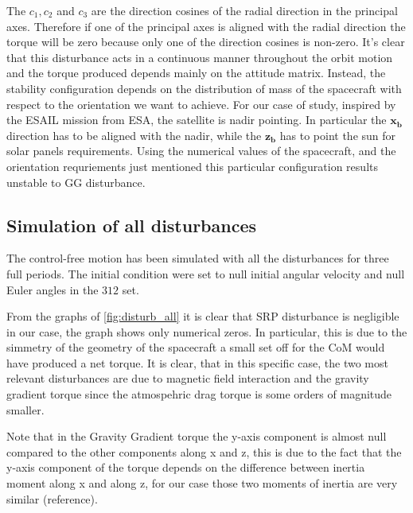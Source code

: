 The \( c_1, c_2 \) and \( c_3 \) are the direction cosines of the radial direction in the principal axes. 
Therefore if one of the principal axes is aligned with the radial direction the torque will be zero because only one of the direction cosines is non-zero.
It's clear that this disturbance acts in a continuous manner throughout the orbit motion and the torque produced depends mainly on the attitude matrix.
Instead, the stability configuration depends on the distribution of mass of the spacecraft with respect to the orientation we want to achieve. For our case of study, 
inspired by the ESAIL mission from ESA, the satellite is nadir pointing. In particular the $\boldsymbol{x_b}$ direction has to be aligned with the nadir, while the $\boldsymbol{z_b}$ has to point the sun for solar panels requirements. Using the numerical values of the spacecraft, and the orientation requriements just mentioned
this particular configuration results unstable to GG disturbance.


\subsection{Simulation of all disturbances}
\label{subsec:sim_disturbances}


The control-free motion has been simulated with all the disturbances for three full periods. 
The initial condition were set to null initial angular velocity and 
null Euler angles in the $312$ set.

From the graphs of \autoref{fig:disturb_all} it is clear that SRP disturbance is negligible
in our case, the graph shows only numerical zeros. In particular, this is due to the simmetry of 
the geometry of the spacecraft a small set off for the CoM would have produced a net torque. 
It is clear, that in this specific case, the two most relevant disturbances are due to magnetic field
interaction and the gravity gradient torque since the atmospehric drag torque is some orders of magnitude 
smaller.

Note that in the Gravity Gradient torque the y-axis component is almost null compared to the other 
components along x and z, this is due to the fact that the y-axis component of the torque depends on 
the difference between inertia moment along x and along z, for our case those two moments of inertia are 
very similar (reference). 